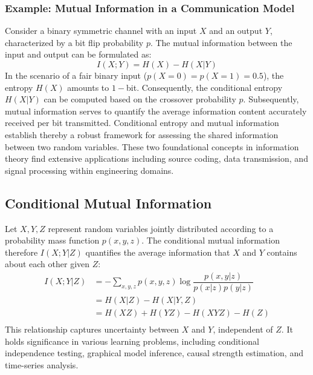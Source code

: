 \documentclass[journal,12pt,onecolumn,draftclsnofoot,]{IEEEtran}
\begin{document}
	
	\subsubsection*{Example: Mutual Information in a Communication Model}
	Consider a binary symmetric channel with an input \(X\) and an output \(Y\), characterized by a bit flip probability \(p\). The mutual information between the input and output can be formulated as:
	\[ I(X; Y) = H(X) - H(X|Y) \]
	In the scenario of a fair binary input (\(p(X=0) = p(X=1) = 0.5\)), the entropy \(H(X)\) amounts to \(1-\)bit. Consequently, the conditional entropy \(H(X|Y)\) can be computed based on the crossover probability \(p\). Subsequently, mutual information serves to quantify the average information content accurately received per bit transmitted. Conditional entropy and mutual information establish thereby a robust framework for assessing the shared information between two random variables. These two foundational concepts in information theory find extensive applications including source coding, data transmission, and signal processing within engineering domains.
	
	\subsection{Conditional Mutual Information}
	Let \(X,Y,Z\) represent random variables jointly distributed according to a probability mass function \(p(x,y,z)\). The conditional mutual information therefore \(I(X; Y |Z)\) quantifies the average information that \(X\) and \(Y\) contains about each other given \(Z\):
	\begin{equation}
		\begin{split}
			I(X; Y |Z) & = - \sum_{x,y,z}  p(x,y,z) \log \dfrac{p(x,y|z)}{p(x|z)p(y|z)} \\
			& = H(X|Z) - H(X|Y,Z) \\
			& = H(X Z) + H(Y Z) - H(X Y Z) - H(Z) \\
		\end{split}
	\end{equation}
	This relationship captures  uncertainty between \(X\) and \(Y\), independent of \(Z\). It holds significance in various learning problems, including conditional independence testing, graphical model inference, causal strength estimation, and time-series analysis.
	
\end{document}
